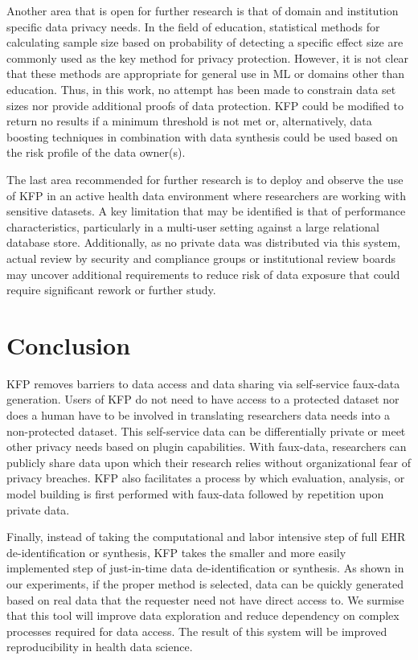 \documentclass{amia}
\begin{document}
Another area that is open for further research is that of domain and institution specific data privacy needs. In the field of education, statistical methods for calculating sample size based on probability of detecting a specific effect size are commonly used \cite{naep_2009} as the key method for privacy protection. However, it is not clear that these methods are appropriate for general use in ML or domains other than education. Thus, in this work, no attempt has been made to constrain data set sizes nor provide additional proofs of data protection. KFP could be modified to return no results if a minimum threshold is not met or, alternatively, data boosting techniques in combination with data synthesis could be used based on the risk profile of the data owner(s).

The last area recommended for further research is to deploy and observe the use of KFP in an active health data environment where researchers are working with sensitive datasets. A key limitation that may be identified is that of performance characteristics, particularly in a multi-user setting against a large relational database store. Additionally, as no private data was distributed via this system, actual review by security and compliance groups or institutional review boards may uncover additional requirements to reduce risk of data exposure that could require significant rework or further study.

\section{Conclusion}

KFP removes barriers to data access and data sharing via self-service faux-data generation. Users of KFP do not need to have access to a protected dataset nor does a human have to be involved in translating researchers data needs into a non-protected dataset. This self-service data can be differentially private or meet other privacy needs based on plugin capabilities. With faux-data, researchers can publicly share data upon which their research relies without organizational fear of privacy breaches. KFP also facilitates a process by which evaluation, analysis, or model building is first performed with faux-data followed by repetition upon private data. 

Finally, instead of taking the computational and labor intensive step of full EHR de-identification or synthesis, KFP takes the smaller and more easily implemented step of just-in-time data de-identification or synthesis. As shown in our experiments, if the proper method is selected, data can be quickly generated based on real data that the requester need not have direct access to. We surmise that this tool will improve data exploration and reduce dependency on complex processes required for data access. The result of this system will be improved reproducibility in health data science.




\end{document}
